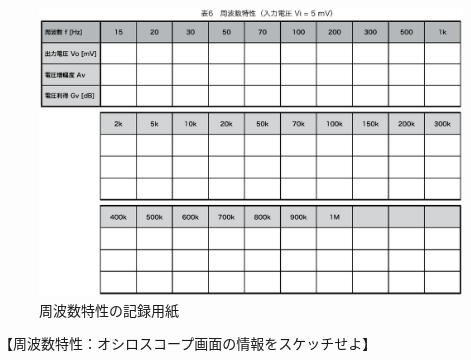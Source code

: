 \documentclass[uplatex,a4paper,11pt,oneside,openany]{jsbook}
\begin{document}
\newpage

\begin{figure}[H]
	\centering
	\includegraphics[keepaspectratio, scale=0.76, angle=90]
	{figs/eps/kiroku.eps}
	\caption{周波数特性の記録用紙}
	\label{fig:22_2}
\end{figure}

\newpage

【周波数特性：オシロスコープ画面の情報をスケッチせよ】
\end{document}
